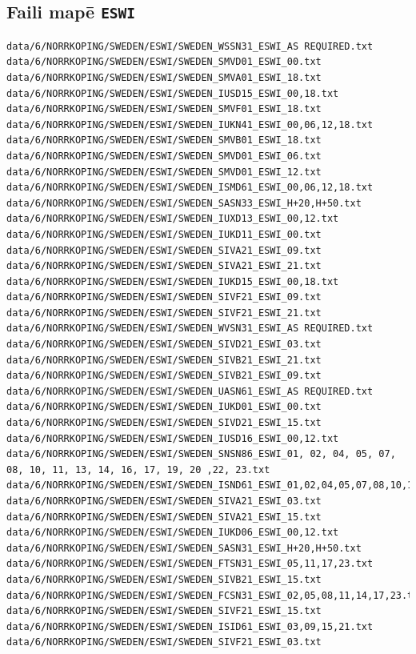 \documentclass[12pt,a4paper]{article}
\begin{document}
\subsection*{Faili mapē \texttt{ESWI}}
\begin{lstlisting}[breaklines]
data/6/NORRKOPING/SWEDEN/ESWI/SWEDEN_WSSN31_ESWI_AS REQUIRED.txt
data/6/NORRKOPING/SWEDEN/ESWI/SWEDEN_SMVD01_ESWI_00.txt
data/6/NORRKOPING/SWEDEN/ESWI/SWEDEN_SMVA01_ESWI_18.txt
data/6/NORRKOPING/SWEDEN/ESWI/SWEDEN_IUSD15_ESWI_00,18.txt
data/6/NORRKOPING/SWEDEN/ESWI/SWEDEN_SMVF01_ESWI_18.txt
data/6/NORRKOPING/SWEDEN/ESWI/SWEDEN_IUKN41_ESWI_00,06,12,18.txt
data/6/NORRKOPING/SWEDEN/ESWI/SWEDEN_SMVB01_ESWI_18.txt
data/6/NORRKOPING/SWEDEN/ESWI/SWEDEN_SMVD01_ESWI_06.txt
data/6/NORRKOPING/SWEDEN/ESWI/SWEDEN_SMVD01_ESWI_12.txt
data/6/NORRKOPING/SWEDEN/ESWI/SWEDEN_ISMD61_ESWI_00,06,12,18.txt
data/6/NORRKOPING/SWEDEN/ESWI/SWEDEN_SASN33_ESWI_H+20,H+50.txt
data/6/NORRKOPING/SWEDEN/ESWI/SWEDEN_IUXD13_ESWI_00,12.txt
data/6/NORRKOPING/SWEDEN/ESWI/SWEDEN_IUKD11_ESWI_00.txt
data/6/NORRKOPING/SWEDEN/ESWI/SWEDEN_SIVA21_ESWI_09.txt
data/6/NORRKOPING/SWEDEN/ESWI/SWEDEN_SIVA21_ESWI_21.txt
data/6/NORRKOPING/SWEDEN/ESWI/SWEDEN_IUKD15_ESWI_00,18.txt
data/6/NORRKOPING/SWEDEN/ESWI/SWEDEN_SIVF21_ESWI_09.txt
data/6/NORRKOPING/SWEDEN/ESWI/SWEDEN_SIVF21_ESWI_21.txt
data/6/NORRKOPING/SWEDEN/ESWI/SWEDEN_WVSN31_ESWI_AS REQUIRED.txt
data/6/NORRKOPING/SWEDEN/ESWI/SWEDEN_SIVD21_ESWI_03.txt
data/6/NORRKOPING/SWEDEN/ESWI/SWEDEN_SIVB21_ESWI_21.txt
data/6/NORRKOPING/SWEDEN/ESWI/SWEDEN_SIVB21_ESWI_09.txt
data/6/NORRKOPING/SWEDEN/ESWI/SWEDEN_UASN61_ESWI_AS REQUIRED.txt
data/6/NORRKOPING/SWEDEN/ESWI/SWEDEN_IUKD01_ESWI_00.txt
data/6/NORRKOPING/SWEDEN/ESWI/SWEDEN_SIVD21_ESWI_15.txt
data/6/NORRKOPING/SWEDEN/ESWI/SWEDEN_IUSD16_ESWI_00,12.txt
data/6/NORRKOPING/SWEDEN/ESWI/SWEDEN_SNSN86_ESWI_01, 02, 04, 05, 07, 08, 10, 11, 13, 14, 16, 17, 19, 20 ,22, 23.txt
data/6/NORRKOPING/SWEDEN/ESWI/SWEDEN_ISND61_ESWI_01,02,04,05,07,08,10,11,13,14,16,17,19,20,22,23.txt
data/6/NORRKOPING/SWEDEN/ESWI/SWEDEN_SIVA21_ESWI_03.txt
data/6/NORRKOPING/SWEDEN/ESWI/SWEDEN_SIVA21_ESWI_15.txt
data/6/NORRKOPING/SWEDEN/ESWI/SWEDEN_IUKD06_ESWI_00,12.txt
data/6/NORRKOPING/SWEDEN/ESWI/SWEDEN_SASN31_ESWI_H+20,H+50.txt
data/6/NORRKOPING/SWEDEN/ESWI/SWEDEN_FTSN31_ESWI_05,11,17,23.txt
data/6/NORRKOPING/SWEDEN/ESWI/SWEDEN_SIVB21_ESWI_15.txt
data/6/NORRKOPING/SWEDEN/ESWI/SWEDEN_FCSN31_ESWI_02,05,08,11,14,17,23.txt
data/6/NORRKOPING/SWEDEN/ESWI/SWEDEN_SIVF21_ESWI_15.txt
data/6/NORRKOPING/SWEDEN/ESWI/SWEDEN_ISID61_ESWI_03,09,15,21.txt
data/6/NORRKOPING/SWEDEN/ESWI/SWEDEN_SIVF21_ESWI_03.txt

\end{lstlisting}
\end{document}
